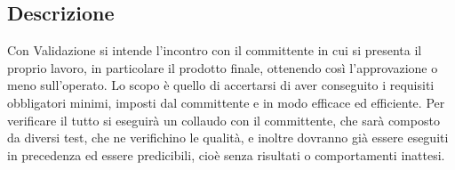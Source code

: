 \subsection{Descrizione}
Con Validazione si intende l'incontro con il committente in cui si presenta il proprio lavoro, in particolare il
prodotto finale, ottenendo così l'approvazione o meno sull'operato. \newline
Lo scopo è quello di accertarsi di aver conseguito i requisiti obbligatori minimi, imposti dal committente e
in modo efficace ed efficiente. Per verificare il tutto si eseguirà un collaudo con il committente, che sarà composto
da diversi test, che ne verifichino le qualità, e inoltre dovranno già essere eseguiti in precedenza ed essere
predicibili, cioè senza risultati o comportamenti inattesi.
